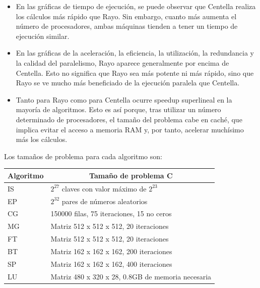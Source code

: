\begin{itemize}
 \item  En las gráficas de tiempo de ejecución, se puede observar que Centella realiza los cálculos más rápido que Rayo. Sin embargo, cuanto más aumenta el número de procesadores, ambas máquinas tienden a tener un tiempo de ejecución similar.
 \item  En las gráficas de la aceleración, la eficiencia, la utilización, la redundancia y la calidad del paralelismo, Rayo aparece generalmente por encima de Centella. Esto no significa que Rayo sea más potente ni más rápido, sino que Rayo se ve mucho más beneficiado de la ejecución paralela que Centella.
 \item Tanto para Rayo como para Centella ocurre speedup superlineal en la mayoría de algoritmos. Esto es así porque, tras utilizar un número determinado de procesadores, el tamaño del problema cabe en caché, que implica evitar el acceso a memoria RAM y, por tanto, acelerar muchísimo más los cálculos.
\end{itemize}

Los tamaños de problema para cada algoritmo son:

\begin{center}
\begin{tabular}{|l|l|l|l|l|}
\hline
Algoritmo & \multicolumn{4}{c|}{Tamaño de problema C} \\ \hline
IS        & \multicolumn{4}{l|}{$ 2^{27} $ claves con valor máximo de $ 2^{23} $}     \\ \hline
EP        & \multicolumn{4}{l|}{$ 2^{32} $ pares de números aleatorios}                   \\ \hline
CG        & \multicolumn{4}{l|}{150000 filas, 75 iteraciones, 15 no ceros}                   \\ \hline
MG        & \multicolumn{4}{l|}{Matriz 512 x 512 x 512, 20 iteraciones}                   \\ \hline
FT        & \multicolumn{4}{l|}{Matriz 512 x 512 x 512, 20 iteraciones}                   \\ \hline
BT        & \multicolumn{4}{l|}{Matriz 162 x 162 x 162, 200 iteraciones}                   \\ \hline
SP        & \multicolumn{4}{l|}{Matriz 162 x 162 x 162, 400 iteraciones}                   \\ \hline
LU        & \multicolumn{4}{l|}{Matriz 480 x 320 x 28, 0.8GB de memoria necesaria}                   \\ \hline
\end{tabular}
\end{center}

